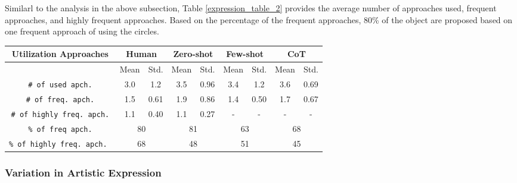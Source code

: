 Similarl to the analysis in the above subsection, Table \ref{expression_table_2} provides the average number of approaches used, frequent approaches, and highly frequent approaches. 
Based on the percentage of the frequent approaches, 80\% of the object are proposed based on one frequent approach of using the circles.

\begin{table*}
  \caption{Quantative analysis of human and GenAI narrow creativity based on material utilization approaches. For the number of used approaches, frequent approaches, and highly frequent approaches, a higher value indicates better performance. Conversely, for the percentage of objects within frequent and highly frequent approaches, a lower value reflects better performance.}
  \label{expression_table_2}
  \begin{tabular}{ccccccccc}
    \toprule
    Utilization Approaches                     &  \multicolumn{2}{c}{Human}          & \multicolumn{2}{c}{Zero-shot} & \multicolumn{2}{c}{Few-shot} &\multicolumn{2}{c}{CoT}\\
    \midrule
                                               & Mean & Std.          & Mean & Std.     & Mean & Std.  & Mean & Std. \\
    \texttt{\# of used apch.}                  & 3.0 & 1.2            & 3.5 & 0.96       & 3.4 & 1.2     & 3.6 & 0.69 \\
    \texttt{\# of freq. apch.}                 & 1.5 & 0.61           & 1.9 & 0.86       & 1.4 & 0.50    & 1.7 & 0.67 \\
    \texttt{\# of highly freq. apch.}          & 1.1 & 0.40           & 1.1 & 0.27       & - & -     & - & - \\ \hline
    \texttt{\% of freq apch.}                  & \multicolumn{2}{c}{80}             & \multicolumn{2}{c}{81}        & \multicolumn{2}{c}{63}      & \multicolumn{2}{c}{68}  \\
    \texttt{\% of highly freq. apch. }         & \multicolumn{2}{c}{68}             & \multicolumn{2}{c}{48}        & \multicolumn{2}{c}{51}      & \multicolumn{2}{c}{45}  \\
    \bottomrule
  \end{tabular}
\end{table*}

\subsubsection{Variation in Artistic Expression}

